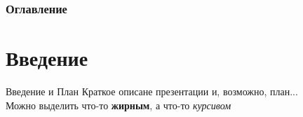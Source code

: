 \documentclass[11pt]{beamer} %
\begin{document}

\frame{\titlepage} %

\begin{frame}
    \frametitle{Оглавление}
    \tableofcontents
\end{frame}




\section{Введение}
    \begin{frame}{Введение и План}
        Краткое описане презентации и, возможно, план...\\
        Можно выделить что-то \textbf{жирным}, а что-то \textit{курсивом}
    \end{frame}
\end{document}
